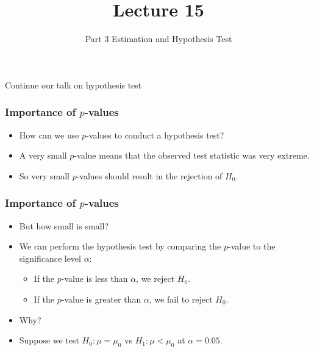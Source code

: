 \documentclass[14pt]{beamer}
\title[ECON2843]{Lecture 15}
\subtitle{Part 3 Estimation and Hypothesis Test}
\date{}
\begin{document}
	\begin{frame}
		\titlepage
	\end{frame}
	\begin{frame}
		\vspace{1cm}
		\centering
		{\color{blue}\large Continue our talk on hypothesis test}
	\end{frame}
	
\begin{frame}
	\frametitle{Importance of $p$-values}
	
	\begin{itemize}[label={\color{blue}$\blacktriangleright$}]
		\item How can we use $p$-values to conduct a hypothesis test?
		\item A very small $p$-value means that the observed test statistic was very extreme.
		\item So very small $p$-values should result in the rejection of $H_0$.
	\end{itemize}
	
\end{frame}
\begin{frame}
	\frametitle{Importance of $p$-values}
	
	\begin{itemize}[label={\color{blue}$\blacktriangleright$}]
		\item But how small is small?
		\item We can perform the hypothesis test by comparing the $p$-value to the significance level $\alpha$:
		\begin{itemize}[label={\color{blue}$\blacktriangleright$}]
			\item If the $p$-value is less than $\alpha$, we reject $H_0$.
			\item If the $p$-value is greater than $\alpha$, we fail to reject $H_0$.
		\end{itemize}
		\item Why?
		\item Suppose we test $H_0 : \mu = \mu_0$ vs $H_1 : \mu < \mu_0$ at $\alpha = 0.05$.
	\end{itemize}
	
\end{frame}
\end{document}
